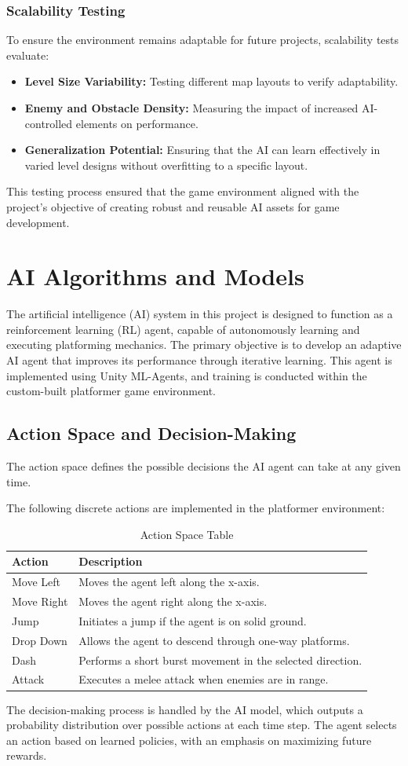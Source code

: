 \documentclass[12pt,oneside,openright,a4paper]{cpe-english-project}
\begin{document}
\subsubsection{Scalability Testing}
To ensure the environment remains adaptable for future projects, scalability tests evaluate:
\begin{itemize}
\item  \textbf{Level Size Variability:} Testing different map layouts to verify adaptability.
\item  \textbf{Enemy and Obstacle Density:} Measuring the impact of increased AI-controlled elements on performance.
\item  \textbf{Generalization Potential:} Ensuring that the AI can learn effectively in varied level designs without overfitting to a specific layout.
\end{itemize}
This testing process ensured that the game environment aligned with the project's objective of creating robust and reusable AI assets for game development.
\section{AI Algorithms and Models}
The artificial intelligence (AI) system in this project is designed to function as a reinforcement learning (RL) agent, capable of autonomously learning and executing platforming mechanics. The primary objective is to develop an adaptive AI agent that improves its performance through iterative learning. This agent is implemented using Unity ML-Agents, and training is conducted within the custom-built platformer game environment.
\subsection{Action Space and Decision-Making}
The action space defines the possible decisions the AI agent can take at any given time.\par
The following discrete actions are implemented in the platformer environment:\par
\begin{table}[!h]
\caption{Action Space Table}\label{tbl:Action Space Table}
\begin{tabular}{|l|l|} \hline
\textbf{Action} & \textbf{Description} \\ \hline
Move Left & Moves the agent left along the x-axis. \\ 
Move Right & Moves the agent right along the x-axis. \\ 
Jump & Initiates a jump if the agent is on solid ground. \\ 
Drop Down & Allows the agent to descend through one-way platforms. \\ 
Dash & Performs a short burst movement in the selected direction. \\ 
Attack & Executes a melee attack when enemies are in range. \\ \hline
\end{tabular}
\end{table}
The decision-making process is handled by the AI model, which outputs a probability distribution over possible actions at each time step. The agent selects an action based on learned policies, with an emphasis on maximizing future rewards.
\end{document}
